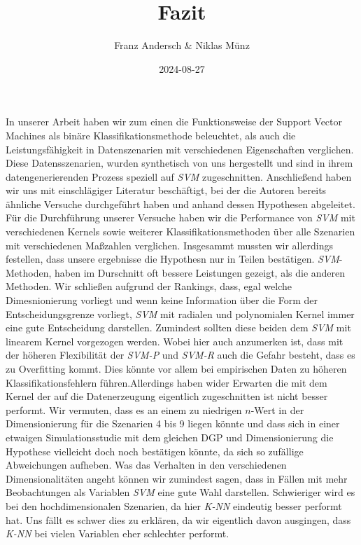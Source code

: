 \documentclass[
]{article}
\title{Fazit}
\author{Franz Andersch \& Niklas Münz}
\date{2024-08-27}
\renewcommand{\maketitle}{}
\begin{document}
\maketitle

In unserer Arbeit haben wir zum einen die Funktionsweise der Support
Vector Machines als binäre Klassifikationsmethode beleuchtet, als auch
die Leistungsfähigkeit in Datenszenarien mit verschiedenen Eigenschaften
verglichen. Diese Datensszenarien, wurden synthetisch von uns
hergestellt und sind in ihrem datengenerierenden Prozess speziell auf
\textit{SVM} zugeschnitten. Anschließend haben wir uns mit einschlägiger
Literatur beschäftigt, bei der die Autoren bereits ähnliche Versuche
durchgeführt haben und anhand dessen Hypothesen abgeleitet. Für die
Durchführung unserer Versuche haben wir die Performance von \textit{SVM}
mit verschiedenen Kernels sowie weiterer Klassifikationsmethoden über
alle Szenarien mit verschiedenen Maßzahlen verglichen. \newline 
Insgesammt mussten wir allerdings festellen, dass unsere ergebnisse die
Hypothesn nur in Teilen bestätigen. \textit{SVM}-Methoden, haben im
Durschnitt oft bessere Leistungen gezeigt, als die anderen Methoden. Wir
schließen aufgrund der Rankings, dass, egal welche Dimesnionierung
vorliegt und wenn keine Information über die Form der
Entscheidungsgrenze vorliegt, \textit{SVM} mit radialen und polynomialen
Kernel immer eine gute Entscheidung darstellen. Zumindest sollten diese
beiden dem \textit{SVM} mit linearem Kernel vorgezogen werden. Wobei
hier auch anzumerken ist, dass mit der höheren Flexibilität der
\textit{SVM-P} und \textit{SVM-R} auch die Gefahr besteht, dass es zu
Overfitting kommt. Dies könnte vor allem bei empirischen Daten zu
höheren Klassifikationsfehlern führen.\newline Allerdings haben wider
Erwarten die  mit dem Kernel der auf die Datenerzeugung
eigentlich zugeschnitten ist nicht besser performt. Wir vermuten, dass
es an einem zu niedrigen \(n\)-Wert in der Dimensionierung für die
Szenarien 4 bis 9 liegen könnte und dass sich in einer etwaigen
Simulationsstudie mit dem gleichen DGP und Dimensionierung die Hypothese
vielleicht doch noch bestätigen könnte, da sich so zufällige
Abweichungen aufheben. Was das Verhalten in den verschiedenen
Dimensionalitäten angeht können wir zumindest sagen, dass in Fällen mit
mehr Beobachtungen als Variablen \textit{SVM} eine gute Wahl darstellen.
Schwieriger wird es bei den hochdimensionalen Szenarien, da hier
\textit{K-NN} eindeutig besser performt hat. Uns fällt es schwer dies zu
erklären, da wir eigentlich davon ausgingen, dass \textit{K-NN} bei
vielen Variablen eher schlechter performt.
\end{document}
